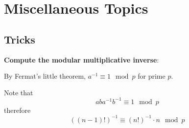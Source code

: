 \documentclass[11pt]{article}
\begin{document}
\section{Miscellaneous Topics}
\label{sec:orga1ee72c}
\subsection{Tricks}
\label{sec:org72ff072}
\textbf{Compute the modular multiplicative inverse}:

By Fermat's little theorem, \(a^{-1}\equiv 1\mod p\) for prime \(p\).

Note that
\begin{equation*}
aba^{-1}b^{-1}\equiv 1\mod p
\end{equation*}
therefore
\begin{equation*}
((n-1)!)^{-1}\equiv(n!)^{-1}\cdot n\mod p
\end{equation*}
\end{document}
